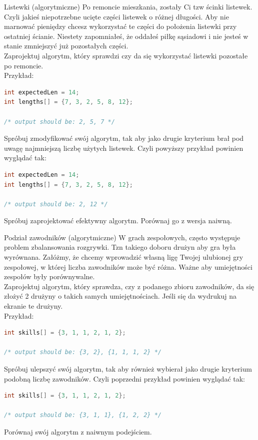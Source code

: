 \begin{exercise}{Listewki (algorytmiczne)}{}
Po remoncie mieszkania, zostały Ci tzw ścinki listewek. Czyli jakieś niepotrzebne ucięte części listewek o różnej długości.
Aby nie marnować pieniędzy chcesz wykorzystać te części do położenia listewki przy ostatniej ścianie. Niestety zapomniałeś, że oddałeś piłkę sąsiadowi i nie jesteś w stanie zmniejszyć już pozostałych części. \\

Zaprojektuj algorytm, który sprawdzi czy da się wykorzystać listewki pozostałe po remoncie. \\
Przykład:
\begin{lstlisting}[language=C,style=C99]
int expectedLen = 14;
int lengths[] = {7, 3, 2, 5, 8, 12};

/* output should be: 2, 5, 7 */
\end{lstlisting}

Spróbuj zmodyfikować swój algorytm, tak aby jako drugie kryterium brał pod uwagę najmniejszą liczbę użytych listewek.
Czyli powyższy przykład powinien wyglądać tak:
\begin{lstlisting}[language=C,style=C99]
int expectedLen = 14;
int lengths[] = {7, 3, 2, 5, 8, 12};

/* output should be: 2, 12 */
\end{lstlisting}
Spróbuj zaprojektować efektywny algorytm. Porównaj go z wersja naiwną.
\end{exercise}

\begin{exercise}{Podział zawodników (algorytmiczne)}{}
W grach zespołowych, często występuje problem zbalansowania rozgrywki. Tzn takiego doboru drużyn aby gra była wyrównana.
Załóżmy, że chcemy wprowadzić własną ligę Twojej ulubionej gry zespołowej, w której liczba zawodników może być różna. Ważne aby umiejętności zespołów były porównywalne. \\

Zaprojektuj algorytm, który sprawdza, czy z podanego zbioru zawodników, da się złożyć 2 drużyny o takich samych umiejętnościach. Jeśli się da wydrukuj na ekranie te drużyny. \\
Przykład:
\begin{lstlisting}[language=C,style=C99]
int skills[] = {3, 1, 1, 2, 1, 2};

/* output should be: {3, 2}, {1, 1, 1, 2} */
\end{lstlisting}

Spróbuj ulepszyć swój algorytm, tak aby również wybierał jako drugie kryterium podobną liczbę zawodników.
Czyli poprzedni przykład powinien wyglądać tak:
\begin{lstlisting}[language=C,style=C99]
int skills[] = {3, 1, 1, 2, 1, 2};

/* output should be: {3, 1, 1}, {1, 2, 2} */
\end{lstlisting}
Porównaj swój algorytm z naiwnym podejściem.
\end{exercise}

